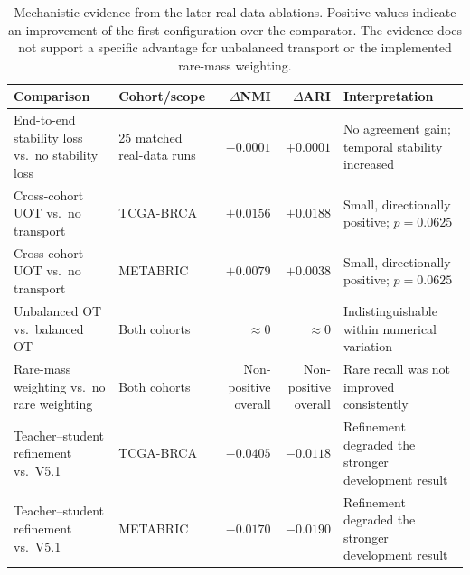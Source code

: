 \begin{table}[t]
\centering
\caption{Mechanistic evidence from the later real-data ablations. Positive values indicate an improvement of the first configuration over the comparator. The evidence does not support a specific advantage for unbalanced transport or the implemented rare-mass weighting.}
\label{tab:component-evidence}
\footnotesize
\setlength{\tabcolsep}{3pt}
\begin{tabularx}{\textwidth}{@{}p{}p{}rrX@{}}
\toprule
Comparison & Cohort/scope & $\Delta$NMI & $\Delta$ARI & Interpretation \\
\midrule
End-to-end stability loss vs.\ no stability loss & 25 matched real-data runs & $-0.0001$ & $+0.0001$ & No agreement gain; temporal stability increased \\
Cross-cohort UOT vs.\ no transport & TCGA-BRCA & $+0.0156$ & $+0.0188$ & Small, directionally positive; $p=0.0625$ \\
Cross-cohort UOT vs.\ no transport & METABRIC & $+0.0079$ & $+0.0038$ & Small, directionally positive; $p=0.0625$ \\
Unbalanced OT vs.\ balanced OT & Both cohorts & $\approx 0$ & $\approx 0$ & Indistinguishable within numerical variation \\
Rare-mass weighting vs.\ no rare weighting & Both cohorts & \shortstack{Non-positive\\overall} & \shortstack{Non-positive\\overall} & Rare recall was not improved consistently \\
Teacher--student refinement vs.\ V5.1 & TCGA-BRCA & $-0.0405$ & $-0.0118$ & Refinement degraded the stronger development result \\
Teacher--student refinement vs.\ V5.1 & METABRIC & $-0.0170$ & $-0.0190$ & Refinement degraded the stronger development result \\
\bottomrule
\end{tabularx}
\end{table}
